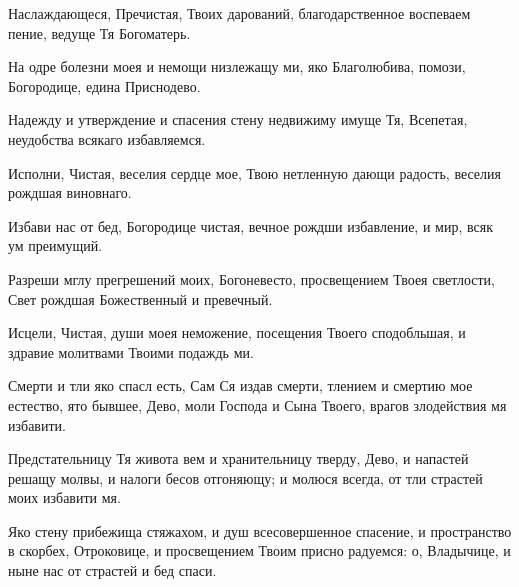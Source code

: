 \begin{mymulticols}
Наслаждающеся, Пречистая, Твоих дарований, благодарственное воспеваем пение, ведуще Тя Богоматерь.

\slava

На одре болезни моея и немощи низлежащу ми, яко Благолюбива, помози, Богородице, едина Приснодево.

\inyne

Надежду и утверждение и спасения стену недвижиму имуще Тя, Всепетая, неудобства всякаго избавляемся.




Исполни, Чистая, веселия сердце мое, Твою нетленную дающи радость, веселия рождшая виновнаго.


Избави нас от бед, Богородице чистая, вечное рождши избавление, и мир, всяк ум преимущий.

\slava

Разреши мглу прегрешений моих, Богоневесто, просвещением Твоея светлости, Свет рождшая Божественный и превечный.

\inyne

Исцели, Чистая, души моея неможение, посещения Твоего сподобльшая, и здравие молитвами Твоими подаждь ми.




Смерти и тли яко спасл есть, Сам Ся издав смерти, тлением и смертию мое естество, ято бывшее, Дево, моли Господа и Сына Твоего, врагов злодействия мя избавити.


Предстательницу Тя живота вем и хранительницу тверду, Дево, и напастей решащу молвы, и налоги бесов отгоняющу; и молюся всегда, от тли страстей моих избавити мя.

\slava

Яко стену прибежища стяжахом, и душ всесовершенное спасение, и пространство в скорбех, Отроковице, и просвещением Твоим присно радуемся: о, Владычице, и ныне нас от страстей и бед спаси.


\end{mymulticols}
